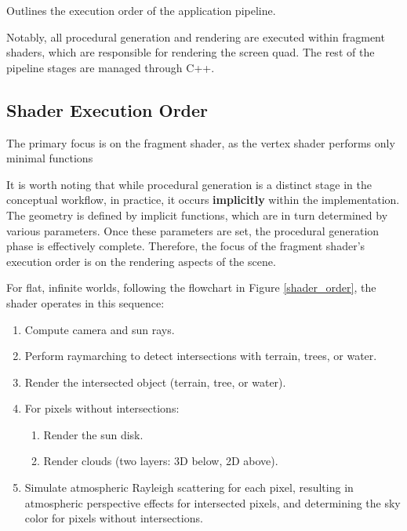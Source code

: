 {Outlines the execution order of the application pipeline.}

Notably, all procedural generation and rendering are executed within fragment shaders, which are responsible for rendering the screen quad. The rest of the pipeline stages are managed through C++.

\subsection{Shader Execution Order}

The primary focus is on the fragment shader, as the vertex shader performs only minimal functions

It is worth noting that while procedural generation is a distinct stage in the conceptual workflow, in practice, it occurs \textbf{implicitly} within the implementation. The geometry is defined by implicit functions, which are in turn determined by various parameters. Once these parameters are set, the procedural generation phase is effectively complete. Therefore, the focus of the fragment shader’s execution order is on the rendering aspects of the scene.

For flat, infinite worlds, following the flowchart in Figure \ref{shader_order}, the shader operates in this sequence:
\begin{enumerate}
    \item Compute camera and sun rays.
    \item Perform raymarching to detect intersections with terrain, trees, or water.
    \item Render the intersected object (terrain, tree, or water).
    \item For pixels without intersections:
        \begin{enumerate}
            \item Render the sun disk.
            \item Render clouds (two layers: 3D below, 2D above).
        \end{enumerate}
    \item Simulate atmospheric Rayleigh scattering for each pixel, resulting in atmospheric perspective effects for intersected pixels, and determining the sky color for pixels without intersections.
\end{enumerate}


